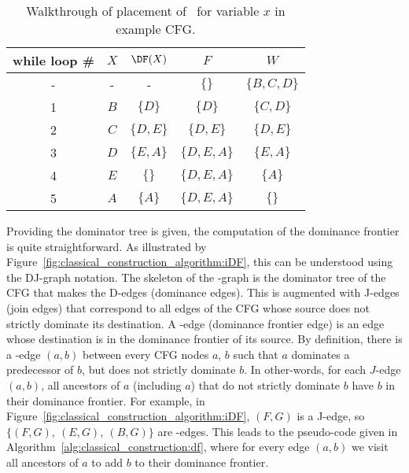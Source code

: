 {\begin{table}
  {\def\sp{@{\kern1.5em}}
\begin{center}
  \begin{tabular}{c\sp c\sp c\sp c\sp c}
\textbf{while loop \#} & $X$ & $\DF(X)$ & $F$         & $W$\\ \hline
-                      & -   & -                & $\{\}$      & $\{B,C,D\}$ \\
1                      & $B$ & $\{D\}$          & $\{D\}$     & $\{C,D\}$ \\
2                      & $C$ & $\{D,E\}$        & $\{D,E\}$   & $\{D,E\}$ \\
3                      & $D$ & $\{E,A\}$        & $\{D,E,A\}$ & $\{E,A\}$\\
4                      & $E$ & $\{\}$           & $\{D,E,A\}$ & $\{A\}$\\
5                      & $A$ & $\{A\}$          & $\{D,E,A\}$ & $\{\}$\\ 
\end{tabular}
\end{center}
}
\caption{\label{table:classical_construction:walkthru} Walkthrough of
  placement of \phifuns\ for variable $x$ in example CFG.}
\end{table}


Providing the dominator tree is given, the computation of the dominance frontier is quite straightforward. 
As illustrated by Figure~\ref{fig:classical_construction_algorithm:iDF}, this can be understood using the DJ-graph notation. 
The skeleton of the \DJ-graph is the dominator tree of the CFG that makes the D-edges (dominance edges). 
This is augmented with J-edges (join edges) that correspond to all edges of the CFG whose source does not strictly dominate its destination. 
A \DF-edge (dominance frontier edge) is an edge whose destination is in the dominance frontier of its source. 
By definition, there is a \DF-edge $(a,b)$ between every CFG nodes $a$, $b$ such that $a$ dominates a predecessor of $b$, but does not strictly dominate $b$. 
In other-words, for each $J$-edge $(a,b)$, all ancestors of $a$ (including $a$) that do not strictly dominate $b$ have $b$ in their dominance frontier. 
For example, in Figure~\ref{fig:classical_construction_algorithm:iDF}, $(F,G)$ is a J-edge, so $\{(F,G),\ (E,G),\ (B,G)\}$ are \DF-edges. 
This leads to the pseudo-code given in Algorithm~\ref{alg:classical_construction:df}, where for every edge $(a,b)$ we visit all ancestors of $a$ to add $b$ to their dominance frontier.
 
}
